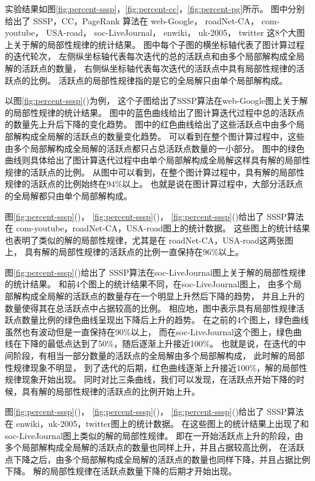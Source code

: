 实验结果如图\ref{fig:percent-sssp}，\ref{fig:percent-cc}，\ref{fig:percent-pg}所示。
图中分别给出了 SSSP，CC，PageRank 算法在 
web-Google， roadNet-CA， com-youtube， USA-road， 
soc-LiveJournal， enwiki， uk-2005， twitter 
这8个大图上关于解的局部性规律的统计结果。
图中每个子图的横坐标轴代表了图计算过程的迭代轮次，
左侧纵坐标轴代表每次迭代的总的活跃点和由多个局部解构成全局解的活跃点的数量，
右侧纵坐标轴代表每次迭代的活跃点中具有局部性规律的活跃点的比例。
活跃点的局部性规律指的是它的全局解只由单个局部解构成。

以图\ref{fig:percent-sssp}()为例，
这个子图给出了SSSP算法在web-Google图上关于解的局部性规律的统计结果。
图中的蓝色曲线给出了图计算迭代过程中总的活跃点的数量先上升后下降的变化趋势。
图中的红色曲线给出了这些活跃点中由多个局部解构成全局解的活跃点的数量变化趋势。
可以看到在整个图计算过程中，这些由多个局部解构成全局解的活跃点都只占总活跃点数量的一小部分。
图中的绿色曲线则具体给出了图计算迭代过程中由单个局部解构成全局解这样具有解的局部性规律的活跃点的比例。
从图中可以看到，在整个图计算过程中，具有解的局部性规律的活跃点的比例始终在94\%以上。
也就是说在图计算过程中，大部分活跃点的全局解都只由单个局部解构成。

图\ref{fig:percent-sssp}()，
\ref{fig:percent-sssp}()，
\ref{fig:percent-sssp}()给出了
SSSP算法在 com-youtube，roadNet-CA，USA-road图上的统计数据。
这些图上的统计结果也表明了类似的解的局部性规律，尤其是在
roadNet-CA，USA-road这两张图上，
具有解的局部性规律的活跃点的比例一直保持在96\%以上。

图\ref{fig:percent-sssp}()给出了
SSSP算法在soc-LiveJournal图上关于解的局部性规律的统计结果。
和前4个图上的统计结果不同，在soc-LiveJournal图上，
由多个局部解构成全局解的活跃点的数量存在一个明显上升然后下降的趋势，
并且上升的数量使得其在总活跃点中占据较高的比例。
相应地，图中表示具有局部性规律活跃点数量比例的绿色曲线呈现出下降后上升的趋势。
在之前的4个图上，绿色曲线虽然也有波动但是一直保持在90\%以上，
而在soc-LiveJournal这个图上，绿色曲线在下降的最低点达到了50\%，随后逐渐上升接近100\%。
也就是说，在迭代的中间阶段，有相当一部分数量的活跃点的全局解由多个局部解构成，
此时解的局部性规律现象不明显，
到了迭代的后期，红色曲线逐渐上升接近100\%，解的局部性规律现象开始出现。
同时对比三条曲线，我们可以发现，在活跃点开始下降的时候，具有解的局部性规律的活跃点的比例开始上升。

图\ref{fig:percent-sssp}()，
\ref{fig:percent-sssp}()，
\ref{fig:percent-sssp}()给出了
SSSP算法在 enwiki，uk-2005，twitter图上的统计数据。
在这些图上的统计结果上出现了和soc-LiveJournal图上类似的解的局部性规律。
即在一开始活跃点上升的阶段，由多个局部解构成全局解的活跃点的数量也同样上升，并且占据较高比例，
在活跃点下降之后，由多个局部解构成全局解的活跃点的数量也同样下降，并且占据比例下降。
解的局部性规律在活跃点数量下降的后期才开始出现。



